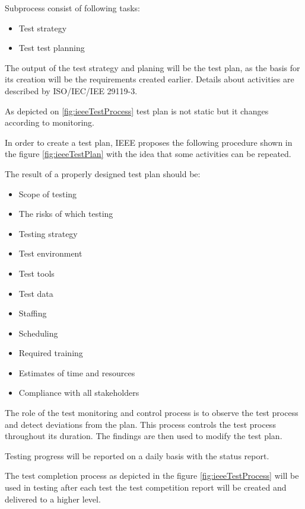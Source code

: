 Subprocess consist of following tasks:
\begin{itemize}
  \item Test strategy
  \item Test test planning
\end{itemize}

The output of the test strategy and planing will be the test plan, as the basis for its creation will be the requirements created earlier. Details about activities are described by ISO/IEC/IEE 29119-3.

As depicted on \ref{fig:ieeeTestProcess} test plan is not static but it changes according to monitoring.


In order to create a test plan, IEEE proposes the following procedure shown in the figure \ref{fig:ieeeTestPlan} with the idea that some activities can be repeated.

The result of a properly designed test plan should be:
\begin{itemize}
  \item Scope of testing
  \item The risks of which testing
  \item Testing strategy
  \item Test environment
  \item Test tools
  \item Test data
  \item Staffing
  \item Scheduling
  \item Required training
  \item Estimates of time and resources
  \item Compliance with all stakeholders
\end{itemize}

The role of the test monitoring and control process is to observe the test process and detect deviations from the plan. This process controls the test process throughout its duration. The findings are then used to modify the test plan.

Testing progress will be reported on a daily basis with the status report.

The test completion process as depicted in the figure \ref{fig:ieeeTestProcess} will be used in testing after each test the test competition report will be created and delivered to a higher level.


